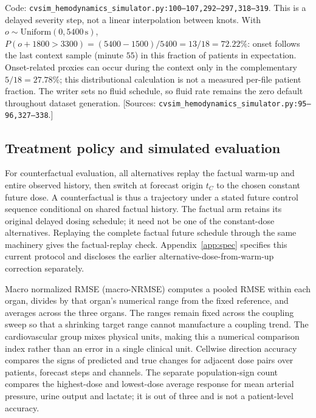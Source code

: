 Code: \texttt{cvsim\_\allowbreak{}hemodynamics\_\allowbreak{}simulator.\allowbreak{}py:\allowbreak{}100–\allowbreak{}107,\allowbreak{}292–\allowbreak{}297,\allowbreak{}318–\allowbreak{}319}. This is a delayed severity step, not a linear interpolation between knots. With $o\sim\mathrm{Uniform}(0,5400\,\mathrm{s})$, $P(o+1800>3300)=(5400-1500)/5400=13/18=72.22\%$: onset follows the last context sample (minute $55$) in this fraction of patients in expectation. Onset-related proxies can occur during the context only in the complementary $5/18=27.78\%$; this distributional calculation is not a measured per-file patient fraction.\label{app:onsetfraction} The writer sets no fluid schedule, so fluid rate remains the zero default throughout dataset generation. [Sources: \texttt{cvsim\_\allowbreak{}hemodynamics\_\allowbreak{}simulator.\allowbreak{}py:\allowbreak{}95–\allowbreak{}96,\allowbreak{}327–\allowbreak{}338}.]

\subsection{Treatment policy and simulated evaluation}\label{app:sharedhistoryprotocol}


For counterfactual evaluation, all alternatives replay the factual warm-up and entire observed history, then switch at forecast origin $t_C$ to the chosen constant future dose. A counterfactual is thus a trajectory under a stated future control sequence conditional on shared factual history. The factual arm retains its original delayed dosing schedule; it need not be one of the constant-dose alternatives. Replaying the complete factual future schedule through the same machinery gives the factual-replay check. Appendix~\ref{app:spec} specifies this current protocol and discloses the earlier alternative-dose-from-warm-up correction separately.


Macro normalized RMSE (macro-NRMSE) computes a pooled RMSE within each organ, divides by that organ's numerical range from the fixed reference, and averages across the three organs. The ranges remain fixed across the coupling sweep so that a shrinking target range cannot manufacture a coupling trend. The cardiovascular group mixes physical units, making this a numerical comparison index rather than an error in a single clinical unit. Cellwise direction accuracy compares the signs of predicted and true changes for adjacent dose pairs over patients, forecast steps and channels. The separate population-sign count compares the highest-dose and lowest-dose average response for mean arterial pressure, urine output and lactate; it is out of three and is not a patient-level accuracy.


